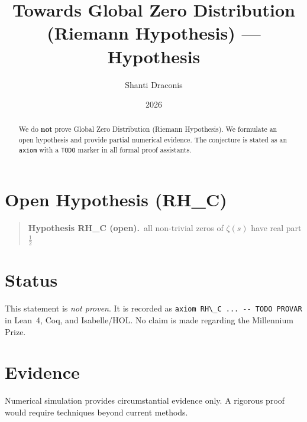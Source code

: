 \documentclass[11pt]{article}
\title{Towards Global Zero Distribution (Riemann Hypothesis) — Hypothesis}
\author{Shanti Draconis}
\date{2026}
\begin{document}
\maketitle

\begin{abstract}
We do \textbf{not} prove Global Zero Distribution (Riemann Hypothesis).
We formulate an open hypothesis and provide partial numerical evidence.
The conjecture is stated as an \texttt{axiom} with a \texttt{TODO}
marker in all formal proof assistants.
\end{abstract}

\section{Open Hypothesis (RH\_C)}
\begin{quote}
  \textbf{Hypothesis RH\_C (open).}~all non-trivial zeros of $\zeta(s)$ have real part $\tfrac12$
\end{quote}

\section{Status}
This statement is \emph{not proven}.  It is recorded as
\verb|axiom RH\_C ... -- TODO PROVAR| in Lean~4, Coq, and Isabelle/HOL.
No claim is made regarding the Millennium Prize.

\section{Evidence}
Numerical simulation provides circumstantial evidence only.
A rigorous proof would require techniques beyond current methods.
\end{document}
